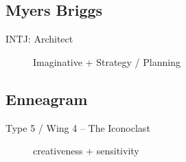 \documentclass[10pt, a4paper, twocolumn]{article}
\begin{document}
\subsection*{Myers Briggs}
\begin{description}

 \item[INTJ: Architect] %
 \item[] Imaginative + Strategy / Planning
\end{description}


 \subsection*{Enneagram}
 \begin{description}

 \item[Type 5 / Wing 4 -- The Iconoclast] %
 \item[] creativeness + sensitivity
 \end{description}

\end{document}

